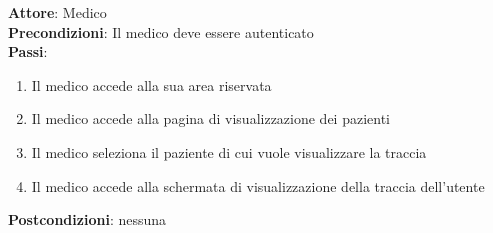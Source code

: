\documentclass[a4paper]{article}
\begin{document}
\begin{mdframed}
	\textbf{Attore}: Medico\\
	\textbf{Precondizioni}: Il medico deve essere autenticato\\
	\textbf{Passi}: 
	\begin{enumerate}[nosep]
	  \item Il medico accede alla sua area riservata
	  \item Il medico accede alla pagina di visualizzazione dei pazienti
	  \item Il medico seleziona il paziente di cui vuole visualizzare la traccia
	  \item Il medico accede alla schermata di visualizzazione della traccia dell'utente
	\end{enumerate}
	\textbf{Postcondizioni}: nessuna
\end{mdframed}
\end{document}
